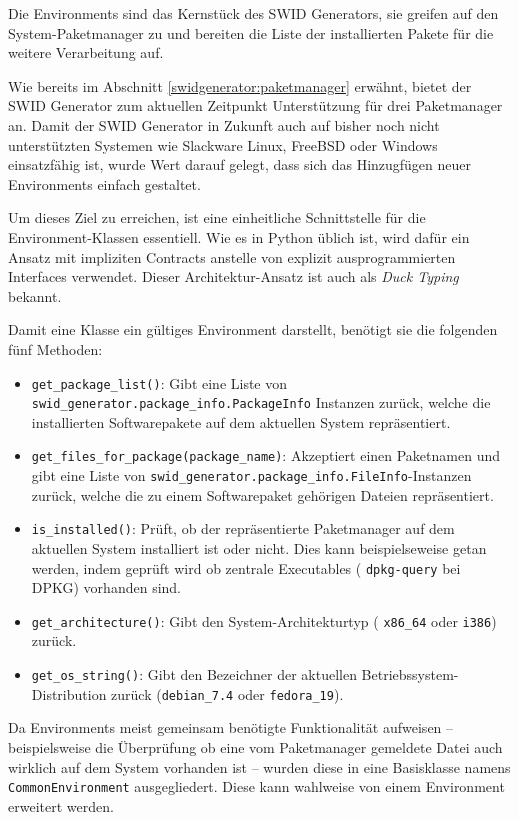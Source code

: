 Die Environments sind das Kernstück des SWID Generators, sie greifen auf
den System-Paketmanager zu und bereiten die Liste der installierten Pakete für
die weitere Verarbeitung auf.

Wie bereits im Abschnitt \ref{swidgenerator:paketmanager} erwähnt, bietet der
SWID Generator zum aktuellen Zeitpunkt Unterstützung für drei Paketmanager an.
Damit der SWID Generator in Zukunft auch auf bisher noch nicht unterstützten
Systemen wie Slackware Linux, FreeBSD oder Windows einsatzfähig ist, wurde Wert
darauf gelegt, dass sich das Hinzugfügen neuer Environments einfach gestaltet.

Um dieses Ziel zu erreichen, ist eine einheitliche Schnittstelle für die
Environment-Klassen essentiell. Wie es in Python üblich
ist\cite{contracts:2003}, wird dafür ein Ansatz mit impliziten Contracts
anstelle von explizit ausprogrammierten Interfaces verwendet. Dieser
Architektur-Ansatz ist auch als \textit{Duck Typing} bekannt.

Damit eine Klasse ein gültiges Environment darstellt, benötigt sie die folgenden
fünf Methoden:

\begin{itemize}
	\item \texttt{get\_package\_list()}: Gibt eine Liste von
		\texttt{swid\_generator.\-package\_info.\-PackageInfo} Instanzen zurück,
		welche die installierten Softwarepakete auf dem aktuellen System
		repräsentiert.
	\item \texttt{get\_files\_for\_package(package\_name)}: Akzeptiert einen
		Paketnamen und gibt eine Liste von
		\texttt{swid\_generator.\-package\_info.\-FileInfo}-Instanzen zurück, welche
		die zu einem Softwarepaket gehörigen Dateien repräsentiert.
	\item \texttt{is\_installed()}: Prüft, ob der repräsentierte Paketmanager auf
		dem aktuellen System installiert ist oder nicht. Dies kann beispielseweise
		getan werden, indem geprüft wird ob zentrale Executables (\zb
		\texttt{dpkg-query} bei DPKG) vorhanden sind.
	\item \texttt{get\_architecture()}: Gibt den System-Architekturtyp (\zb
		\texttt{x86\_64} oder \texttt{i386}) zurück.
	\item \texttt{get\_os\_string()}: Gibt den Bezeichner der aktuellen
		Betriebssystem-Distribution zurück (\zb \texttt{debian\_7.4} oder
		\texttt{fedora\_19}).
\end{itemize}

Da Environments meist gemeinsam benötigte Funktionalität aufweisen --
beispielsweise die Überprüfung ob eine vom Paketmanager gemeldete Datei auch
wirklich auf dem System vorhanden ist -- wurden diese in eine Basisklasse namens
\texttt{CommonEnvironment} ausgegliedert. Diese kann wahlweise von einem
Environment erweitert werden.

